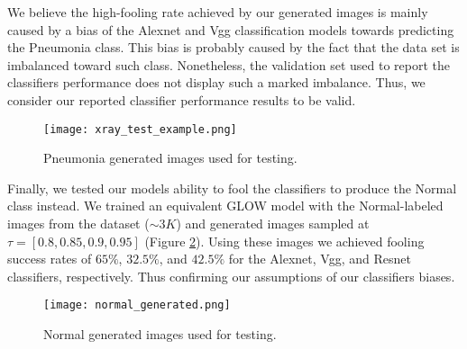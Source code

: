 We believe the high-fooling rate achieved by our generated images is mainly caused by a bias of the Alexnet and Vgg classification models towards predicting the Pneumonia class. This bias is probably caused by the fact that the data set is imbalanced toward such class. Nonetheless, the validation set used to report the classifiers performance does not display such a marked imbalance. Thus, we consider our reported classifier performance results to be valid.  

    \begin{figure}[!htbp]
        \centering
        \texttt{[image: xray\_test\_example.png]}
        \caption{Pneumonia generated images used for testing.}
        \label{fig:pneumonia_test_samples}
    \end{figure}

Finally, we tested our models ability to fool the classifiers to produce the Normal class instead. We trained an equivalent GLOW model with the Normal-labeled images from the dataset ($\sim 3K$) and generated images sampled at $\tau = [0.8, 0.85, 0.9, 0.95]$ (Figure \ref{fig:normal_test_samples}). Using these images we achieved fooling success rates of $65\%$, $32.5\%$, and $42.5\%$ for the Alexnet, Vgg, and Resnet classifiers, respectively. Thus confirming our assumptions of our classifiers biases.

    \begin{figure}[!htbp]
        \centering
        \texttt{[image: normal\_generated.png]}
        \caption{Normal generated images used for testing.}
        \label{fig:normal_test_samples}
    \end{figure}


